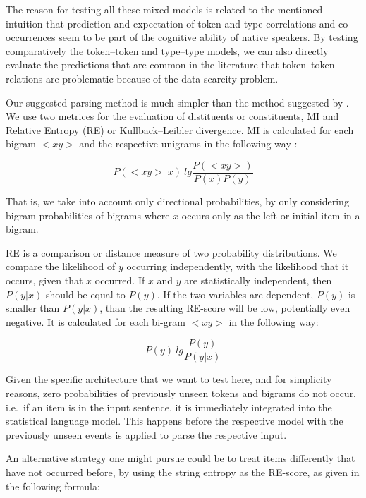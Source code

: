 \documentclass[11pt,a4paper,english]{article}
\begin{document}
The reason for testing all these mixed models is related to the mentioned intuition that prediction and expectation of token and type correlations and co-occurrences seem to be part of the cognitive ability of native speakers. By testing comparatively the token--token and type--type models, we can also directly evaluate the predictions that are common in the literature that token--token relations are problematic because of the data scarcity problem.

Our suggested parsing method is much simpler than the method suggested by \cite{Marcus:ea:1993}. We use two metrices for the evaluation of distituents or constituents, MI and Relative Entropy (RE) or Kullback–Leibler divergence. MI is calculated for each bigram $<\!xy\!>$ and the respective unigrams in the following way \citep[cf.][]{MacKay:2003}:

\begin{equation}
P(<\!xy\!>\!|x) ~ lg \frac{P(<\!xy\!>)}{P(x)P(y)}
\end{equation}

That is, we take into account only directional probabilities, by only considering bigram probabilities of bigrams where $x$ occurs only as the left or initial item in a bigram.

RE is a comparison or distance measure of two probability distributions. We compare the likelihood of $y$ occurring independently, with the likelihood that it occurs, given that $x$ occurred. If $x$ and $y$ are statistically independent, then $P(y|x)$ should be equal to $P(y)$. If the two variables are dependent, $P(y)$ is smaller than $P(y|x)$, than the resulting RE-score will be low, potentially even negative. It is calculated for each bi-gram $<\!xy\!>$ in the following way:

\begin{equation}\label{Eq:RelativeEntropy}
P(y) ~ lg \frac{P(y)}{P(y|x)}
\end{equation}

Given the specific architecture that we want to test here, and for simplicity reasons, zero probabilities of previously unseen tokens and bigrams do not occur, i.e.\ if an item is in the input sentence, it is immediately integrated into the statistical language model. This happens before the respective model with the previously unseen events is applied to parse the respective input.

An alternative strategy one might pursue could be to treat items differently that have not occurred before, by using the string entropy as the RE-score, as given in the following formula:
\end{document}
